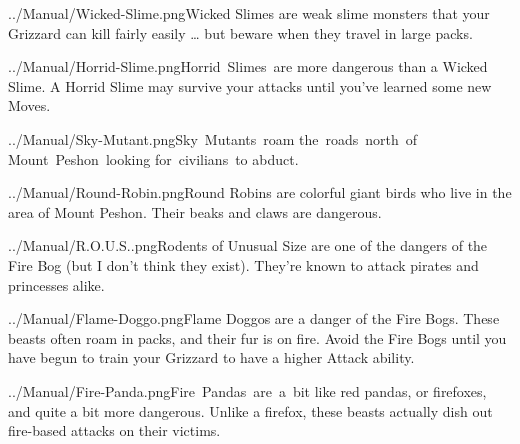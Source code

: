 \documentclass[9pt,twocolumn,openany,article,crop]{memoir}
\newcommand\englishskip{\vspace{14pt}}
\begin{document}
{%
\englishskip

\lettrine[image=true,                lines=4,               findent=3pt,
nindent=3pt]{../Manual/Wicked-Slime.png}\nobreak\hspace{.2em plus 0}Wicked  Slimes  are
weak slime  monsters that  your Grizzard  can kill  fairly easily  … but
beware when they travel in large packs.

\englishskip

\lettrine[image=true,                lines=4,               findent=3pt,
nindent=3pt]{../Manual/Horrid-Slime.png}\nobreak\hspace{.2em plus 0}Horrid~Slimes~are
more dangerous  than a  Wicked Slime.  A Horrid  Slime may  survive your
attacks until you've learned some new Moves.

\englishskip

\lettrine[image=true,                lines=4,               findent=3pt,
nindent=3pt]{../Manual/Sky-Mutant.png}\nobreak\hspace{.2em plus 0}Sky~Mutants~roam
the~roads~north~of Mount~Peshon~looking for~civilians~to abduct.

\englishskip

\lettrine[image=true,                lines=4,               findent=3pt,
nindent=3pt]{../Manual/Round-Robin.png}\nobreak\hspace{.2em plus 0}Round   Robins   are
colorful giant birds  who live in the area of  Mount Peshon. Their beaks
and claws are dangerous.

\ifdefined\ATARIAGESAVE\pagebreak\else\englishskip\fi

\lettrine[image=true,                lines=4,               findent=3pt,
nindent=3pt]{../Manual/R.O.U.S..png}\nobreak\hspace{.2em plus 0}Rodents of Unusual Size
are one of the  dangers of the Fire Bog (but I  don't think they exist).
They're known to attack pirates and princesses alike.

\englishskip

\lettrine[image=true,                lines=4,               findent=3pt,
nindent=3pt]{../Manual/Flame-Doggo.png}\nobreak\hspace{.2em plus 0}Flame   Doggos   are
a danger of the  Fire Bogs. These beasts often roam  in packs, and their
fur is on fire.  Avoid the Fire Bogs until you have  begun to train your
Grizzard to have a higher Attack ability.

\englishskip

\lettrine[image=true,                lines=4,               findent=3pt,
nindent=3pt]{../Manual/Fire-Panda.png}\nobreak\hspace{.2em plus 0}Fire~Pandas~are~a~bit
like  red  pandas,  or  firefoxes,  and  quite  a  bit  more  dangerous.
Unlike a firefox,  these beasts actually dish out  fire-based attacks on
their victims.

}
\end{document}

